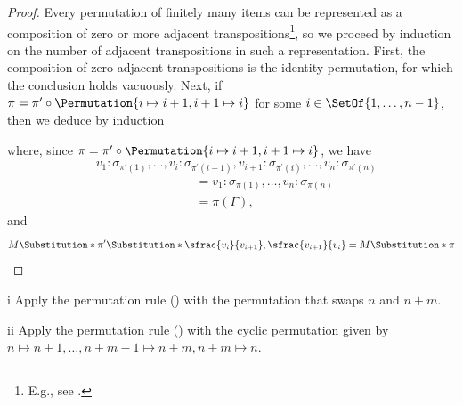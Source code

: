 \begin{proof}
Every permutation of finitely many items can be represented as a composition of zero or more adjacent transpositions\footnote{E.g., see \cite[Chapter~I, \S5, No.~7, Proposition~9]{BourbakiAlgebraI}.}, so we proceed by induction on the number of adjacent transpositions in such a representation.
First, the composition of zero adjacent transpositions is the identity permutation, for which the conclusion holds vacuously.
Next, if \(\pi = \pi^\prime \circ \Permutation{i \mapsto i + 1, i + 1\mapsto i}\) for some \(i \in \SetOf{1, \ldots, n - 1}\), then we deduce by induction
\begin{prooftree}
\end{prooftree}
where, since \(\pi = \pi^\prime \circ \Permutation{i \mapsto i + 1, i + 1\mapsto i}\), we have
\begin{align*}
&v_1 : \sigma_{\pi^\prime(1)}, \ldots, v_i : \sigma_{\pi^\prime(i+1)}, v_{i+1} : \sigma_{\pi^\prime(i)}, \ldots, v_n : \sigma_{\pi^\prime(n)} \\
&\qquad\qquad\qquad\qquad= v_1 : \sigma_{\pi(1)}, \ldots, v_n : \sigma_{\pi(n)} \\
&\qquad\qquad\qquad\qquad= \pi(\Gamma),
\end{align*}
and
\begin{equation*}
M\Substitution*{\pi^\prime}\Substitution*{\sfrac{v_i}{v_{i+1}},\sfrac{v_{i+1}}{v_i}}
= M\Substitution*{\pi}
\qedhere
\end{equation*}
\end{proof}

\begin{partsolution}{i}
Apply the permutation rule () with the permutation that swaps \(n\) and \(n+m\).
\end{partsolution}

\begin{partsolution}{ii}
Apply the permutation rule () with the cyclic permutation
given by \(n \mapsto n + 1, \ldots, n + m - 1 \mapsto n + m, n + m \mapsto n\).
\end{partsolution}

